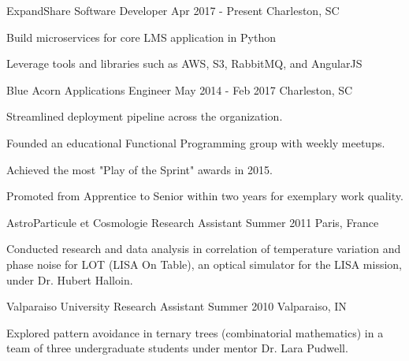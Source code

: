 

\begin{cventries}

  \cventry
    {ExpandShare}
    {Software Developer}
    {Apr 2017 - Present}
    {Charleston, SC}
    {
      \begin{cvitems}
        \item {Build microservices for core LMS application in Python}
        \item {Leverage tools and libraries such as AWS, S3, RabbitMQ, and AngularJS}
      \end{cvitems}
    }

  \cventry
    {Blue Acorn} %
    {Applications Engineer} %
    {May 2014 - Feb 2017} %
    {Charleston, SC} %
    {
      \begin{cvitems} %
        \item {Streamlined deployment pipeline across the organization.}
        \item {Founded an educational Functional Programming group with weekly meetups.}
        \item {Achieved the most "Play of the Sprint" awards in 2015.}
        \item {Promoted from Apprentice to Senior within two years for exemplary work quality.}
      \end{cvitems}
    }

  \cventry
    {AstroParticule et Cosmologie}
    {Research Assistant}
    {Summer 2011}
    {Paris, France}
    {
      \begin{cvitems}
        \item {Conducted research and data analysis in correlation of temperature variation and phase noise for LOT (LISA On Table), an optical simulator for the LISA mission, under Dr. Hubert Halloin.}
      \end{cvitems}
    }

  \cventry
    {Valparaiso University}
    {Research Assistant}
    {Summer 2010}
    {Valparaiso, IN}
    {
      \begin{cvitems}
        \item {Explored pattern avoidance in ternary trees (combinatorial mathematics) in a team of three undergraduate students under mentor Dr. Lara Pudwell.}
      \end{cvitems}
    }

\end{cventries}

